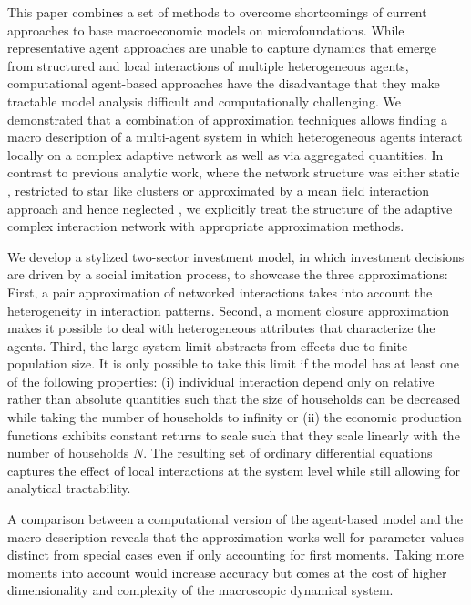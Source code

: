 This paper combines a set of methods to overcome shortcomings of current approaches to base macroeconomic models on microfoundations.
While representative agent approaches are unable to capture dynamics that emerge from structured and local interactions of multiple heterogeneous agents, computational agent-based approaches have the disadvantage that they make tractable model analysis difficult and computationally challenging.
We demonstrated that a combination of approximation techniques allows finding a macro description of a multi-agent system in which heterogeneous agents interact locally on a complex adaptive network as well as via aggregated quantities. 
In contrast to previous analytic work, where the network structure was either static \cite{Lux2016}, restricted to star like clusters \cite{DiGuilmi2012} or approximated by a mean field interaction approach and hence neglected \cite{Aoki1998, Aoki2007, Alfarano2008a, DiGuilmi2008, Chiarella2011a}, we explicitly treat the structure of the adaptive complex interaction network with appropriate approximation methods.

We develop a stylized two-sector investment model, in which investment decisions are driven by a social imitation process, to showcase the three approximations:
First, a pair approximation of networked interactions takes into account the heterogeneity in interaction patterns.
Second, a moment closure approximation makes it possible to deal with heterogeneous attributes that characterize the agents.
Third, the large-system limit abstracts from effects due to finite population size.
It is only possible to take this limit if the model has at least one of the following properties: (i) individual interaction depend only on relative rather than absolute quantities such that the size of households can be decreased while taking the number of households to infinity or (ii) the economic production functions exhibits constant returns to scale such that they scale linearly with the number of households $N$.
The resulting set of ordinary differential equations captures the effect of local interactions at the system level while still allowing for analytical tractability.

A comparison between a computational version of the agent-based model and the macro-description reveals that the approximation works well for parameter values distinct from special cases even if only accounting for first moments. Taking more moments into account would increase accuracy but comes at the cost of higher dimensionality and complexity of the macroscopic dynamical system.

